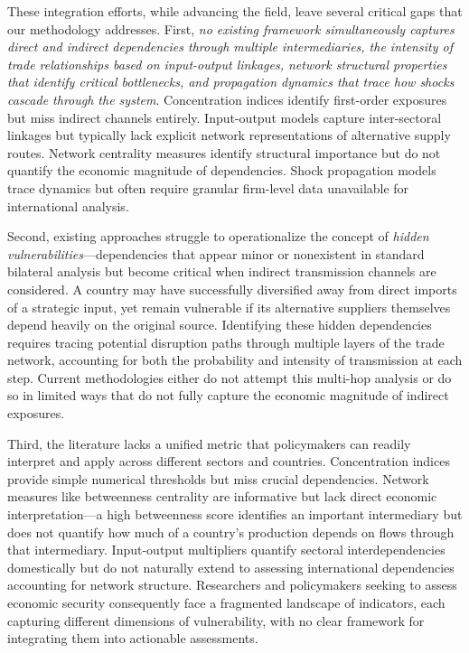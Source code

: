 \documentclass[final,1p,times,authoryear]{elsarticle}
\begin{document}
These integration efforts, while advancing the field, leave several critical gaps that our methodology addresses. First, \textit{no existing framework simultaneously captures direct and indirect dependencies through multiple intermediaries, the intensity of trade relationships based on input-output linkages, network structural properties that identify critical bottlenecks, and propagation dynamics that trace how shocks cascade through the system}. Concentration indices identify first-order exposures but miss indirect channels entirely. Input-output models capture inter-sectoral linkages but typically lack explicit network representations of alternative supply routes. Network centrality measures identify structural importance but do not quantify the economic magnitude of dependencies. Shock propagation models trace dynamics but often require granular firm-level data unavailable for international analysis.

Second, existing approaches struggle to operationalize the concept of \textit{hidden vulnerabilities}—dependencies that appear minor or nonexistent in standard bilateral analysis but become critical when indirect transmission channels are considered. A country may have successfully diversified away from direct imports of a strategic input, yet remain vulnerable if its alternative suppliers themselves depend heavily on the original source. Identifying these hidden dependencies requires tracing potential disruption paths through multiple layers of the trade network, accounting for both the probability and intensity of transmission at each step. Current methodologies either do not attempt this multi-hop analysis or do so in limited ways that do not fully capture the economic magnitude of indirect exposures.

Third, the literature lacks a unified metric that policymakers can readily interpret and apply across different sectors and countries. Concentration indices provide simple numerical thresholds but miss crucial dependencies. Network measures like betweenness centrality are informative but lack direct economic interpretation—a high betweenness score identifies an important intermediary but does not quantify how much of a country's production depends on flows through that intermediary. Input-output multipliers quantify sectoral interdependencies domestically but do not naturally extend to assessing international dependencies accounting for network structure. Researchers and policymakers seeking to assess economic security consequently face a fragmented landscape of indicators, each capturing different dimensions of vulnerability, with no clear framework for integrating them into actionable assessments.
\end{document}
